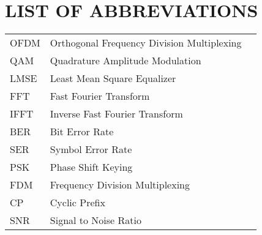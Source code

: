 \section*{LIST OF ABBREVIATIONS}
 {}

\begin{tabularx}{\textwidth}{ L{0.4} L{1.3} L{1.3} }
    OFDM    & Orthogonal Frequency Division Multiplexing \\
    QAM     & Quadrature Amplitude Modulation \\
    LMSE    & Least Mean Square Equalizer \\ %
    FFT     & Fast Fourier Transform \\
    IFFT    & Inverse Fast Fourier Transform \\
    BER     & Bit Error Rate \\
    SER     & Symbol Error Rate \\
    PSK     & Phase Shift Keying \\
    FDM     & Frequency Division Multiplexing \\
    CP      & Cyclic Prefix \\
    SNR     & Signal to Noise Ratio 

\end{tabularx}

\newpage